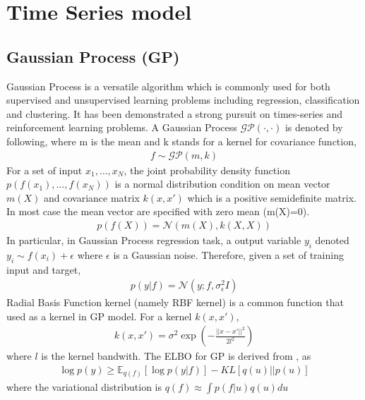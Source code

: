 \section{Time Series model}
\subsection{Gaussian Process (GP)}
Gaussian Process\cite{rasmussen_gaussian_2005} is a versatile algorithm which is commonly used for both supervised and unsupervised learning problems including regression, classification and clustering. It has been demonstrated a strong pursuit on times-series and reinforcement learning problems. A Gaussian Process $ \mathcal{GP}(\cdot,\cdot) $ is denoted by following, where m is the mean and k stands for a kernel for covariance function,
\begin{align*}
f\sim\mathcal{GP}(m,k)
\end{align*}
For a set of input $ x_1,\dots,x_N $, the joint probability density function $ p(f(x_1),\dots,f(x_N)) $ is a normal distribution condition on mean vector $ m(X) $ and covariance matrix $ k(x,x') $ which is a positive semidefinite matrix. In most case the mean vector are specified with zero mean (m(X)=0).
\begin{align*}
p(f(X))=\mathcal{N}(m(X),k(X,X))
\end{align*}
In particular, in Gaussian Process regression task, a output variable $ y_i $ denoted $ y_i\sim f(x_i)+\epsilon $ where $ \epsilon $ is a Gaussian noise. Therefore, given a set of training input and target, 
\begin{align*}
p(y|f)=\mathcal{N}(y;f,\sigma_\epsilon^2I)
\end{align*} 
Radial Basis Function kernel (namely RBF kernel) is a common function that used as a kernel in GP model. For a kernel $ k(x,x') $,
\begin{align*}
k(x,x')=\sigma^2\exp\left(-\frac{||x-x'||^2}{2l^2}\right)
\end{align*}
where $ l $ is the kernel bandwith.
The ELBO for GP is derived from \cite{hensman2013gaussian}, as
\begin{align*}
\log p(y)\geq\mathbb{E}_{q(f)}[\log p(y|f)]-KL[q(u)||p(u)]
\end{align*}
where the variational distribution is $ q(f)\approx\int p(f|u)q(u)du $
